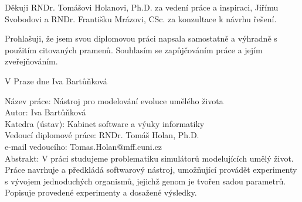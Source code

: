 \documentclass[a4paper,12pt]{report}
\begin{document}

Děkuji RNDr. Tomášovi Holanovi, Ph.D. za vedení práce a inspiraci, Jiřímu Svobodovi a RNDr. Františku Mrázovi, CSc. za konzultace k návrhu řešení. 

\vspace{\fill} %
\noindent Prohlašuji, že jsem svou diplomovou práci napsala samostatně a výhradně s použitím citovaných pramenů. Souhlasím se zapůjčováním práce a jejím zveřejňováním.

\bigskip
\noindent V Praze dne \hspace{\fill}Iva Bartů\v{n}kov\'{a}\\ %


\tableofcontents %



\newpage %

\newpage %

\noindent
Název práce: N\'{a}stroj pro modelov\'{a}n\'{i} evoluce um\v{e}l\'{e}ho \v{z}ivota\\
Autor: Iva Bartů\v{n}kov\'{a}\\
Katedra (ústav): Kabinet software a v\'{y}uky informatiky\\
Vedoucí diplomové práce: RNDr. Tom\'{a}\v{s} Holan, Ph.D.\\
e-mail vedoucího: Tomas.Holan@mff.cuni.cz\\

\noindent Abstrakt: V práci studujeme problematiku simulátorů modelujících umělý život. Práce navrhuje a předkládá softwarový nástroj, umožňující provádět experimenty s vývojem jednoduchých organismů, jejichž genom je tvořen sadou parametrů. Popisuje provedené experimenty a dosažené výsledky.


\end{document}
